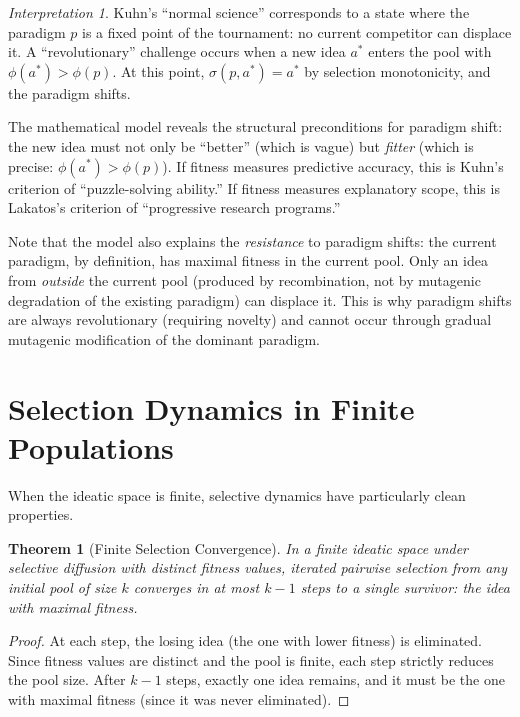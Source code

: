 \documentclass[11pt,openany]{book}
\theoremstyle{definition}
\theoremstyle{plain}
\newtheorem{theorem}[axiom]{Theorem}
\theoremstyle{remark}
\newtheorem{interpretation}[axiom]{Interpretation}
\begin{document}
\begin{interpretation}
Kuhn's ``normal science'' corresponds to a state where the paradigm $p$ is a fixed point of the tournament: no current competitor can displace it. A ``revolutionary'' challenge occurs when a new idea $a^*$ enters the pool with $\phi(a^*) > \phi(p)$. At this point, $\sigma(p, a^*) = a^*$ by selection monotonicity, and the paradigm shifts.

The mathematical model reveals the structural preconditions for paradigm shift: the new idea must not only be ``better'' (which is vague) but \emph{fitter} (which is precise: $\phi(a^*) > \phi(p)$). If fitness measures predictive accuracy, this is Kuhn's criterion of ``puzzle-solving ability.'' If fitness measures explanatory scope, this is Lakatos's criterion of ``progressive research programs.''

Note that the model also explains the \emph{resistance} to paradigm shifts: the current paradigm, by definition, has maximal fitness in the current pool. Only an idea from \emph{outside} the current pool (produced by recombination, not by mutagenic degradation of the existing paradigm) can displace it. This is why paradigm shifts are always revolutionary (requiring novelty) and cannot occur through gradual mutagenic modification of the dominant paradigm.
\end{interpretation}

\section{Selection Dynamics in Finite Populations}

When the ideatic space is finite, selective dynamics have particularly clean properties.

\begin{theorem}[Finite Selection Convergence]
In a finite ideatic space under selective diffusion with distinct fitness values, iterated pairwise selection from any initial pool of size $k$ converges in at most $k - 1$ steps to a single survivor: the idea with maximal fitness.
\end{theorem}

\begin{proof}
At each step, the losing idea (the one with lower fitness) is eliminated. Since fitness values are distinct and the pool is finite, each step strictly reduces the pool size. After $k - 1$ steps, exactly one idea remains, and it must be the one with maximal fitness (since it was never eliminated).
\end{proof}
\end{document}
